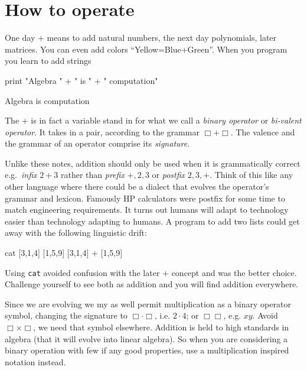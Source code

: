 \chapter{How to operate}

One day  $+$ means to add natural numbers, the next day 
polynomials, later matrices.  
You can even add colors ``Yellow=Blue+Green''. When you program 
you learn to add strings
\begin{center}
\begin{notebookin}
print "Algebra " + " is " + " computation"
\end{notebookin}
\begin{notebookout}
Algebra is computation
\end{notebookout}
\end{center}
The $+$ is in fact a variable stand in for what we call a \emph{binary operator}
or \emph{bi-valent operator}.  It takes in a pair, 
according to the grammar $\Box+\Box$.  The valence and the grammar 
of an operator comprise its  \emph{signature}.  

Unlike these notes, addition should only be used when it is grammatically 
correct e.g.\ \emph{infix} $2+3$ rather than \emph{prefix} $+,2,3$ or
\emph{postfix} $2,3,+$.  Think of this like any other language 
where there could be a dialect that evolves the operator's grammar and lexicon.
Famously HP calculators were postfix for some time to match engineering requirements.
It turns out humans will adapt to technology easier than technology adapting to humans.
A program 
to add two lists could get away with the following linguistic drift:
\begin{center}
\begin{notebookin}
cat [3,1,4] [1,5,9]
[3,1,4] + [1,5,9]
\end{notebookin}
\begin{notebookout}[2]
[3,1,4,1,5,9]
[4,6,13]
\end{notebookout}
\end{center}
Using \texttt{cat} avoided confusion with the later $+$ 
concept and was the better choice.
Challenge yourself to see both as addition and you will 
find addition everywhere. 

Since we are evolving we my as well permit multiplication as a binary operator 
symbol, changing the signature to $\Box \cdot \Box$, i.e. $2\cdot 4$; or
$\Box\Box$, e.g. $xy$.   Avoid $\Box\times \Box$,
we need that symbol elsewhere. Addition is held to high standards in algebra
(that it will evolve into linear algebra).  So when you are considering a
binary operation with few if any good properties, use a
multiplication inspired notation instead.   


